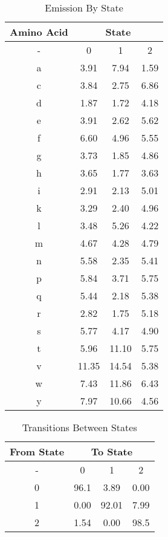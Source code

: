\documentclass{article}
\begin{document}
\begin{table}[!hbp]
    \centering
    \caption{Emission By State}
    \vspace{0.5cm}
    \begin{tabular}{|c|c  c  c|}
        \hline
        \textbf{Amino Acid} & \multicolumn{3}{|c|}{\textbf{State}} \\
        \hline
        -  &  0 & 1 & 2 \\
        \hline
        a & 3.91 & 7.94 & 1.59 \\
        \hline
        c & 3.84 & 2.75 & 6.86 \\
        \hline
        d & 1.87 & 1.72 & 4.18 \\
        \hline
        e & 3.91 & 2.62 & 5.62 \\
        \hline
        f & 6.60 & 4.96 & 5.55 \\
        \hline
        g & 3.73 & 1.85 & 4.86 \\
        \hline
        h & 3.65 & 1.77 & 3.63 \\
        \hline
        i & 2.91 & 2.13 & 5.01 \\
        \hline
        k & 3.29 & 2.40 & 4.96 \\
        \hline
        l & 3.48 & 5.26 & 4.22 \\
        \hline
        m & 4.67 & 4.28 & 4.79 \\
        \hline
        n & 5.58 & 2.35 & 5.41 \\
        \hline
        p & 5.84 & 3.71 & 5.75 \\
        \hline
        q & 5.44 & 2.18 & 5.38 \\
        \hline
        r & 2.82 & 1.75 & 5.18 \\
        \hline
        s & 5.77 & 4.17 & 4.90 \\
        \hline
        t & 5.96 & 11.10 & 5.75 \\
        \hline
        v & 11.35 & 14.54 & 5.38 \\
        \hline
        w & 7.43 & 11.86 & 6.43 \\
        \hline
        y & 7.97 & 10.66 & 4.56 \\
        \hline
    \end{tabular}
    \label{emissions}
\end{table}


\begin{table}[!hbp]
    \centering
    \caption{Transitions Between States }
    \vspace{0.5cm}
    \begin{tabular}{|c|c c c|}
        \hline
        \textbf{From State} & \multicolumn{3}{c|}{\textbf{To State}} \\
        \hline
        - & 0 & 1 & 2 \\
        \hline
        0 & 96.1 & 3.89 & 0.00 \\
        1 & 0.00 & 92.01 & 7.99 \\
        2 & 1.54 & 0.00 & 98.5 \\
        \hline
    \end{tabular}
    \label{transitions}
\end{table}
\end{document}
